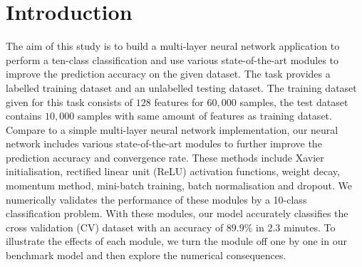 \section{Introduction\label{chapter1}}

The aim of this study is to build a multi-layer neural network application to perform a ten-class classification and use various state-of-the-art modules to improve the prediction accuracy on the given dataset.
The task provides a labelled training dataset and an unlabelled testing dataset.
The training dataset given for this task consists of $128$ features for $60,000$ samples,
the test dataset contains $10,000$ samples with same amount of features as training dataset.
Compare to a simple multi-layer neural network implementation,%
our neural network includes various state-of-the-art modules to further improve the prediction accuracy and convergence rate. These methods include Xavier initialisation, rectified linear unit (ReLU) activation functions, 
weight decay, 
momentum method,
mini-batch training, batch normalisation and dropout.
We numerically validates the performance of these modules by a 10-class classification problem. 
With these modules, our model accurately classifies the cross validation (CV) dataset with an accuracy of $89.9\%$ in $2.3$ minutes. 
To illustrate the effects of each module, we turn the module off one by one in our benchmark model and then explore the numerical consequences.


